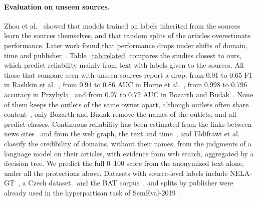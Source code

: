 \documentclass[11pt,a4paper]{article}
\begin{document}
\paragraph{Evaluation on unseen sources.} Zhou et al.~\cite{zhou2021hidden} showed that models trained on labels
inherited from the sources learn the sources themselves, and that random splits of the articles overestimate
performance. Later work found that performance drops under shifts of domain, time and
publisher~\cite{azizov-etal-2024-safari,burdisso-etal-2024-reliability,verhoeven2025yesterday}. Table~\ref{tab:related}
compares the studies closest to ours, which predict reliability mainly from text with labels given to the sources. All those that compare seen with unseen sources report a drop: from 0.91 to 0.65 F1 in Rashkin et al.~\cite{rashkin2017truth},
from 0.94 to 0.86 AUC in Horne et al.~\cite{horne2019robust}, from 0.998 to 0.796 accuracy in
Przyby{\l}a~\cite{przybyla2020capturing} and from 0.97 to 0.72 AUC in Bozarth and Budak~\cite{bozarth2020toward}. None
of them keeps the outlets of the same owner apart, although outlets often share
content~\cite{horne2019spirals,gruppi2021tell}, only Bozarth and Budak remove the names of the outlets, and all predict
classes. Continuous reliability has been estimated from the links between news sites~\cite{burdisso-etal-2024-reliability}
and from the web graph, the text and time~\cite{kondrup2026credibench}, and Eldifrawi et al.~\cite{eldifrawi2026temporal} classify the credibility of domains, without their names, from the
judgments of a language model on their articles, with evidence from web search, aggregated by a decision tree. We predict the full 0--100
score from the anonymized text alone, under all the protections above. Datasets with source-level labels include
NELA-GT~\cite{gruppi2021nela}, a Czech dataset~\cite{bohavcek2022fine} and the BAT
corpus~\cite{DBLP:journals/dbsk/AdjiLS26,batDataset}, and splits by publisher were already used in the hyperpartisan
task of SemEval-2019~\cite{kiesel2019semeval}.
\end{document}
